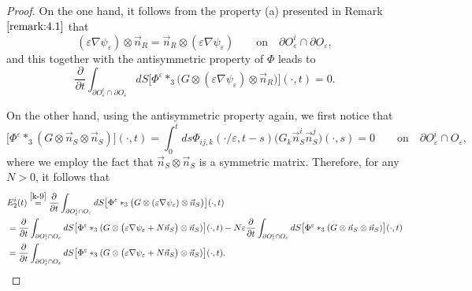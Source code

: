 \documentclass[13pt,CJK]{article}
\theoremstyle{plain}                       %
\theoremstyle{remark}
\numberwithin{equation}{section}
\begin{document}
\begin{proof}
On the one hand, it follows from
the property (a) presented in Remark $\ref{remark:4.1}$ that
\begin{equation*}
(\varepsilon\nabla\psi_\varepsilon)\otimes \vec{n}_R =
\vec{n}_R\otimes(\varepsilon\nabla\psi_\varepsilon)
  \qquad \text{on}\quad \partial O_\varepsilon^i\cap \partial O_\varepsilon,
\end{equation*}
and this together with the antisymmetric property of $\Phi$ leads to
\begin{equation}\label{k-9}
\frac{\partial}{\partial t}
  \int_{\partial O_{\varepsilon}^i\cap \partial O_\varepsilon}dS
  \big[\Phi^\varepsilon\ast_3 \big(G
  \otimes(\varepsilon\nabla\psi_{\varepsilon})\otimes
  \vec{n}_R\big)\big](\cdot,t) = 0.
\end{equation}


On the other hand, using the antisymmetric property again,
we first notice that
\begin{equation*}
\big[\Phi^\varepsilon\ast_3 (G\otimes
  \vec{n}_S\otimes
  \vec{n}_S)\big](\cdot,t)
  =\int_{0}^{t}ds\Phi_{ij,k}(\cdot/\varepsilon,t-s)\big(G_k
  \vec{n}_S^i\vec{n}_S^j\big)(\cdot,s)=0
  \qquad\text{on}\quad \partial O_\varepsilon^i\cap O_\varepsilon,
\end{equation*}
where we employ the fact that $\vec{n}_S\otimes
  \vec{n}_S$ is a symmetric matrix.
Therefore, for any $N>0$, it follows that
\begin{equation*}
\begin{aligned}
&E_{2}^i(t)
  \overset{\eqref{k-9}}{=} \frac{\partial}{\partial t}
  \int_{\partial O_{\varepsilon}^i\cap O_\varepsilon}dS
  \big[\Phi^\varepsilon\ast_3
  \big(G\otimes(\varepsilon\nabla\psi_{\varepsilon})\otimes
  \vec{n}_S\big)\big](\cdot,t) \\
  &= \frac{\partial}{\partial t}
  \int_{\partial O_{\varepsilon}^i\cap O_\varepsilon}dS
  \big[\Phi^\varepsilon\ast_3 (G\otimes
  \big(\varepsilon\nabla\psi_{\varepsilon}+N\vec{n}_S\big)\otimes
  \vec{n}_S)\big](\cdot,t)
  -N\varepsilon \frac{\partial}{\partial t}
  \int_{\partial O_{\varepsilon}^i\cap O_\varepsilon}dS
  \big[\Phi^\varepsilon\ast_3 (G\otimes
  \vec{n}_S\otimes
  \vec{n}_S)\big](\cdot,t) \\
  &= \frac{\partial}{\partial t}\int_{\partial O_{\varepsilon}^i
  \cap O_\varepsilon}dS
  \big[\Phi^\varepsilon\ast_3 (G\otimes
  \big(\varepsilon\nabla\psi_{\varepsilon}+N\vec{n}_S\big)\otimes
  \vec{n}_S)\big](\cdot,t).
\end{aligned}
\end{equation*}


\end{proof}
\end{document}
